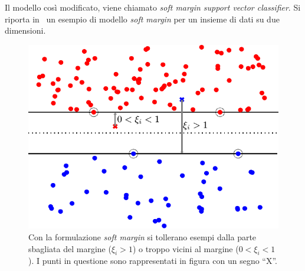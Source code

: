 Il modello così modificato, viene chiamato \emph{soft margin support vector classifier}.
Si riporta in~ un esempio di modello \emph{soft margin} per un insieme di dati su due dimensioni.

\begin{figure}
    \centering
    \includegraphics[width=.7\linewidth]{img/soft_margin.pdf}
    \caption{Con la formulazione \emph{soft margin} si tollerano esempi dalla parte sbagliata del margine ($\xi_i>1$) o troppo vicini al margine ($0<\xi_i<1$). I punti in questione sono rappresentati in figura con un segno ``X''.}
    \label{fig:soft_margin}
\end{figure}



